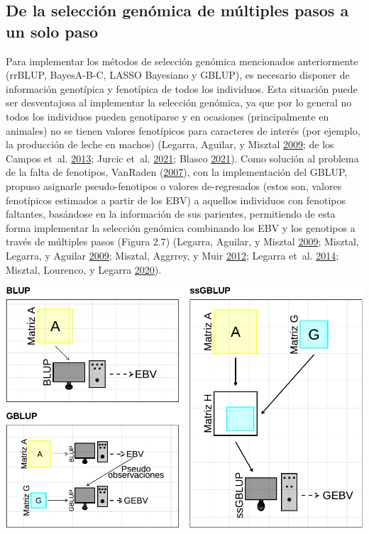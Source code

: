 \documentclass[11pt,spanish,a4paper,oneside,]{book} %
\begin{document}
\hypertarget{de-la-selecciuxf3n-genuxf3mica-de-muxfaltiples-pasos-a-un-solo-paso}{%
\subsection{De la selección genómica de múltiples pasos a un solo paso}\label{de-la-selecciuxf3n-genuxf3mica-de-muxfaltiples-pasos-a-un-solo-paso}}

Para implementar los métodos de selección genómica mencionados anteriormente (rrBLUP, BayesA-B-C, LASSO Bayesiano y GBLUP), es necesario disponer de información genotípica y fenotípica de todos los individuos. Esta situación puede ser desventajosa al implementar la selección genómica, ya que por lo general no todos los individuos pueden genotiparse y en ocasiones (principalmente en animales) no se tienen valores fenotípicos para caracteres de interés (por ejemplo, la producción de leche en machos) (Legarra, Aguilar, y Misztal \protect\hyperlink{ref-cite:17}{2009}; de los Campos et~al. \protect\hyperlink{ref-cite:31}{2013}; Jurcic et~al. \protect\hyperlink{ref-cite:11}{2021}; Blasco \protect\hyperlink{ref-cite:21}{2021}). Como solución al problema de la falta de fenotipos, VanRaden (\protect\hyperlink{ref-cite:39}{2007}), con la implementación del GBLUP, propuso asignarle pseudo-fenotipos o valores de-regresados (estos son, valores fenotípicos estimados a partir de los EBV) a aquellos individuos con fenotipos faltantes, basándose en la información de sus parientes, permitiendo de esta forma implementar la selección genómica combinando los EBV y los genotipos a través de múltiples pasos (Figura 2.7) (Legarra, Aguilar, y Misztal \protect\hyperlink{ref-cite:17}{2009}; Misztal, Legarra, y Aguilar \protect\hyperlink{ref-cite:16}{2009}; Misztal, Aggrrey, y Muir \protect\hyperlink{ref-cite:14}{2012}; Legarra et~al. \protect\hyperlink{ref-cite:15}{2014}; Misztal, Lourenco, y Legarra \protect\hyperlink{ref-cite:18}{2020}).

\begin{center}\includegraphics[width=1\linewidth]{figures/BLUPs_2} \end{center}
\end{document}
